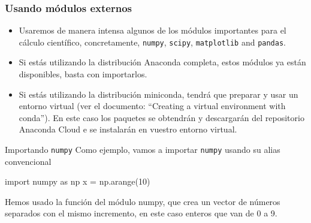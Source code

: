 \documentclass[handout,9pt]{beamer}
\begin{document}
\begin{frame}[fragile]
  \frametitle{Usando módulos externos}
  \begin{itemize}
  \item Usaremos de manera intensa algunos de los módulos importantes
    para el cálculo científico, concretamente, {\tt numpy}, {\tt scipy},
    {\tt matplotlib} and {\tt pandas}.
  \item<2-> Si estás utilizando la distribución Anaconda completa,
    estos módulos ya están disponibles, basta con importarlos.
  \item<3-> Si estás utilizando la distribución  miniconda, tendrá que
    preparar y usar un entorno virtual (ver el documento: ``Creating a virtual environment with
    conda''). En este caso los paquetes se obtendrán y descargarán del
    repositorio  Anaconda Cloud e se instalarán en vuestro entorno virtual.
      \end{itemize} 
      \begin{block}{Importando {\tt numpy}}
        Como ejemplo, vamos a importar  {\tt numpy} usando su alias convencional
        \begin{pyverbatim}
import numpy as np
x = np.arange(10)          
\end{pyverbatim}
Hemos usado la función   del módulo  numpy, que crea un
vector de números separados con el mismo incremento, en este caso
enteros que van de 0 a 9.
\end{block}
\end{frame}
\end{document}
